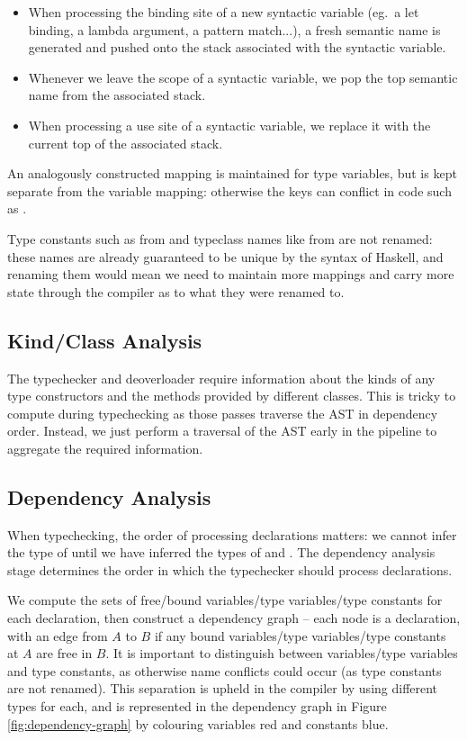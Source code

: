 \documentclass[dissertation.tex]{subfiles}
\begin{document}
{{        \begin{itemize}
        \item When processing the binding site of a new syntactic variable (eg.\ a let binding, a lambda argument, a pattern match...), a fresh semantic name is generated and pushed onto the stack associated with the syntactic variable.
        \item Whenever we leave the scope of a syntactic variable, we pop the top semantic name from the associated stack.
        \item When processing a use site of a syntactic variable, we replace it with the current top of the associated stack.
        \end{itemize}

        An analogously constructed mapping is maintained for type variables, but is kept separate from the variable mapping: otherwise the keys can conflict in code such as .

        Type constants such as  from  and typeclass names like  from  are not renamed: these names are already guaranteed to be unique by the syntax of Haskell, and renaming them would mean we need to maintain more mappings and carry more state through the compiler as to what they were renamed to.
    }
    \subsection{Kind/Class Analysis}
    {
        The typechecker and deoverloader require information about the kinds of any type constructors and the methods provided by different classes. This is tricky to compute during typechecking as those passes traverse the AST in dependency order. Instead, we just perform a traversal of the AST early in the pipeline to aggregate the required information. 
    }
    \subsection{Dependency Analysis}\label{sec:dependency-analysis}
    {
        When typechecking, the order of processing declarations matters: we cannot infer the type of  until we have inferred the types of  and . The dependency analysis stage determines the order in which the typechecker should process declarations. 

        We compute the sets of free/bound variables/type variables/type constants for each declaration, then construct a dependency graph -- each node is a declaration, with an edge from \(A\) to \(B\) if any bound variables/type variables/type constants at \(A\) are free in \(B\). It is important to distinguish between variables/type variables and type constants, as otherwise name conflicts could occur (as type constants are not renamed). This separation is upheld in the compiler by using different types for each, and is represented in the dependency graph in Figure \ref{fig:dependency-graph} by colouring variables red and constants blue.

}}
\end{document}
